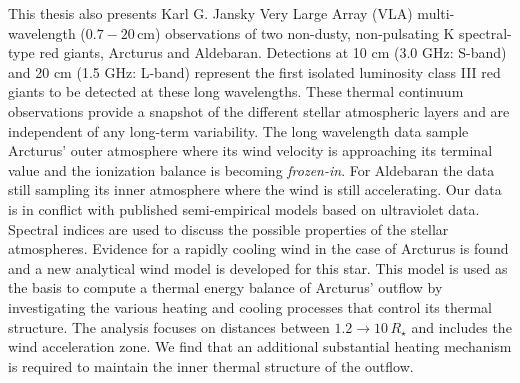 \begin{abstracts}
This thesis also presents Karl G. Jansky Very Large Array (VLA) multi-wavelength ($0.7 - 20$\,cm) observations of two non-dusty, non-pulsating K spectral-type red giants, Arcturus and Aldebaran. Detections at 10 cm (3.0 GHz: S-band) and 20 cm (1.5 GHz: L-band) represent the first isolated luminosity class III red giants to be detected at these long wavelengths. These thermal continuum observations provide  a snapshot of the different stellar atmospheric layers and are independent of any long-term variability. The long wavelength data sample Arcturus' outer atmosphere where its wind velocity is approaching its terminal value and the ionization balance is becoming \textit{frozen-in}. For Aldebaran the data still sampling its inner atmosphere where the wind is still accelerating. Our data is in conflict with published semi-empirical models based on ultraviolet data. Spectral
indices are used to discuss the possible properties of the stellar atmospheres. Evidence for a rapidly cooling wind in the case of Arcturus is found and a new analytical wind model is developed for this star. This model is used as the basis to compute a thermal energy balance of Arcturus' outflow by investigating the various heating and cooling processes that control its thermal structure. The analysis focuses on distances between $1.2\rightarrow 10\,R_{\star}$ and includes the wind acceleration zone. We find that an additional substantial heating mechanism is required to maintain the inner thermal structure of the outflow.

\end{abstracts}

